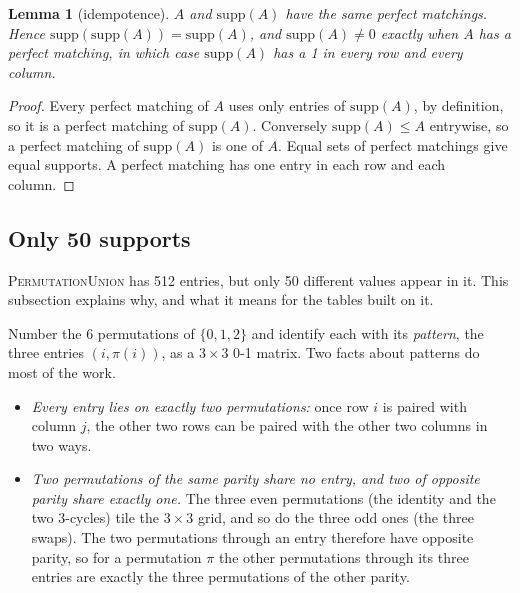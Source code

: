 \documentclass[11pt]{article}
\newtheorem{lemma}[theorem]{Lemma}
\theoremstyle{definition}
\theoremstyle{plain}
\let\origtextsc\textsc
\renewcommand{\textsc}[1]{\textup{\origtextsc{#1}}}
\begin{document}
\begin{lemma}[idempotence]
\label{lem:idempotent}
$A$ and $\mathrm{supp}(A)$ have the same perfect matchings. Hence $\mathrm{supp}(\mathrm{supp}(A))=\mathrm{supp}(A)$, and
$\mathrm{supp}(A)\neq 0$ exactly when $A$ has a perfect matching, in which case $\mathrm{supp}(A)$ has a 1 in every row
and every column.
\end{lemma}
\begin{proof}
Every perfect matching of $A$ uses only entries of $\mathrm{supp}(A)$, by definition, so it is a perfect matching of
$\mathrm{supp}(A)$. Conversely $\mathrm{supp}(A)\le A$ entrywise, so a perfect matching of $\mathrm{supp}(A)$ is one of $A$.
Equal sets of perfect matchings give equal supports. A perfect matching has one entry in each row and each column.
\end{proof}

\subsection{Only 50 supports}
\label{sec:fifty}

\textsc{PermutationUnion} has 512 entries, but only 50 different values appear in it. This subsection explains why,
and what it means for the tables built on it.

Number the 6 permutations of $\{0,1,2\}$ and identify each with its \emph{pattern}, the three entries $(i,\pi(i))$, as a
$3\times 3$ 0-1 matrix. Two facts about patterns do most of the work.
\begin{itemize}
\item \emph{Every entry lies on exactly two permutations:} once row $i$ is paired with column $j$, the other two rows
  can be paired with the other two columns in two ways.
\item \emph{Two permutations of the same parity share no entry, and two of opposite parity share exactly one.} The
  three even permutations (the identity and the two 3-cycles) tile the $3\times 3$ grid, and so do the three odd ones
  (the three swaps). The two permutations through an entry therefore have opposite parity, so for a permutation $\pi$
  the other permutations through its three entries are exactly the three permutations of the other parity.
\end{itemize}
\end{document}
